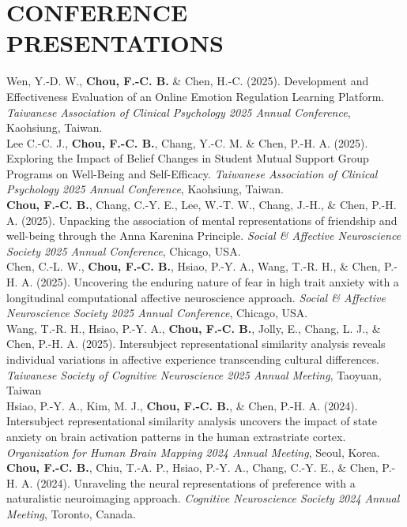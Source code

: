 \documentclass[a4paper,12pt]{article}
\newcommand{\itemspace}{7pt} %
\begin{document}
\section*{CONFERENCE PRESENTATIONS}
\noindent Wen, Y.-D. W., \textbf{Chou, F.-C. B.} \& Chen, H.-C. (2025). Development and Effectiveness Evaluation of an Online Emotion Regulation Learning Platform. \textit{Taiwanese Association of Clinical Psychology 2025 Annual Conference}, Kaohsiung, Taiwan. \\[\itemspace]
\noindent Lee C.-C. J., \textbf{Chou, F.-C. B.}, Chang, Y.-C. M. \& Chen, P.-H. A. (2025). Exploring the Impact of Belief Changes in Student Mutual Support Group Programs on Well-Being and Self-Efficacy. \textit{Taiwanese Association of Clinical Psychology 2025 Annual Conference}, Kaohsiung, Taiwan. \\[\itemspace]
\noindent\textbf{Chou, F.-C. B.}, Chang, C.-Y. E., Lee, W.-T. W., Chang, J.-H., \& Chen, P.-H. A. (2025). Unpacking the association of mental representations of friendship and well-being through the Anna Karenina Principle. \textit{Social \& Affective Neuroscience Society 2025 Annual Conference}, Chicago, USA. \\[\itemspace]
\noindent Chen, C.-L. W., \textbf{Chou, F.-C. B.}, Hsiao, P.-Y. A., Wang, T.-R. H., \& Chen, P.-H. A. (2025). Uncovering the enduring nature of fear in high trait anxiety with a longitudinal computational affective neuroscience approach. \textit{Social \& Affective Neuroscience Society 2025 Annual Conference}, Chicago, USA. \\[\itemspace]
\noindent Wang, T.-R. H., Hsiao, P.-Y. A., \textbf{Chou, F.-C. B.}, Jolly, E., Chang, L. J., \& Chen, P.-H. A. (2025). Intersubject representational similarity analysis reveals individual variations in affective experience transcending cultural differences. \textit{Taiwanese Society of Cognitive Neuroscience 2025 Annual Meeting}, Taoyuan, Taiwan\\[\itemspace]
\noindent Hsiao, P.-Y. A., Kim, M. J., \textbf{Chou, F.-C. B.}, \& Chen, P.-H. A. (2024). Intersubject representational similarity analysis uncovers the impact of state anxiety on brain activation patterns in the human extrastriate cortex. \textit{Organization for Human Brain Mapping 2024 Annual Meeting}, Seoul, Korea.\\[\itemspace]
\noindent \textbf{Chou, F.-C. B.}, Chiu, T.-A. P., Hsiao, P.-Y. A., Chang, C.-Y. E., \& Chen, P.-H. A. (2024). Unraveling the neural representations of preference with a naturalistic neuroimaging approach. \textit{Cognitive Neuroscience Society 2024 Annual Meeting}, Toronto, Canada.\\[\itemspace]
\end{document}
